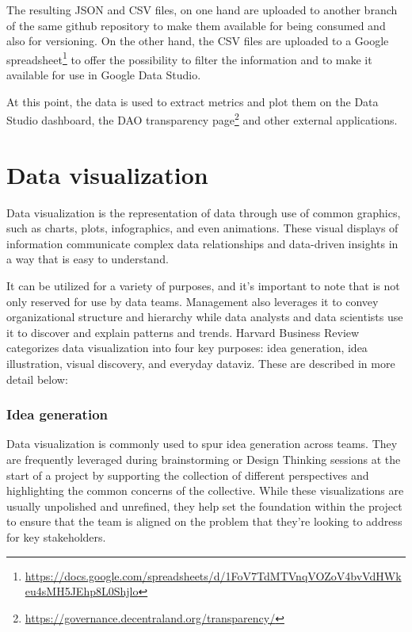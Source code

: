 \documentclass[MSE,Master,english]{twbook}%
\begin{document}
The resulting JSON and CSV files, on one hand are uploaded to another branch of the same github repository to make them available for being consumed and also for versioning. On the other hand, the CSV files are uploaded to a Google spreadsheet\footnote{\url{https://docs.google.com/spreadsheets/d/1FoV7TdMTVnqVOZoV4bvVdHWkeu4sMH5JEhp8L0Shjlo}} to offer the possibility to filter the information and to make it available for use in Google Data Studio.

At this point, the data is used to extract metrics and plot them on the Data Studio dashboard, the DAO transparency page\footnote{\url{https://governance.decentraland.org/transparency/}} and other external applications.

\section{Data visualization}
Data visualization\cite{dataviz} is the representation of data through use of common graphics, such as charts, plots, infographics, and even animations. These visual displays of information communicate complex data relationships and data-driven insights in a way that is easy to understand.

It can be utilized for a variety of purposes, and it's important to note that is not only reserved for use by data teams. Management also leverages it to convey organizational structure and hierarchy while data analysts and data scientists use it to discover and explain patterns and trends. Harvard Business Review\cite{hbr} categorizes data visualization into four key purposes: idea generation, idea illustration, visual discovery, and everyday dataviz. These are described in more detail below:

\subsubsection{Idea generation}
Data visualization is commonly used to spur idea generation across teams. They are frequently leveraged during brainstorming or Design Thinking sessions at the start of a project by supporting the collection of different perspectives and highlighting the common concerns of the collective. While these visualizations are usually unpolished and unrefined, they help set the foundation within the project to ensure that the team is aligned on the problem that they're looking to address for key stakeholders.
\end{document}
